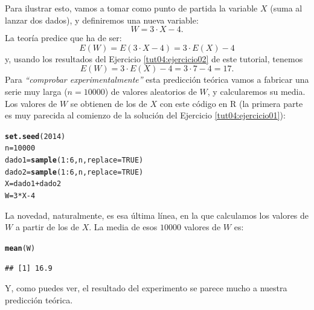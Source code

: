 \documentclass[10pt,a4paper]{article}\usepackage[]{graphicx}\usepackage[]{color}
\makeatletter
\newcommand{\hlnum}[1]{\textcolor[rgb]{0.686,0.059,0.569}{#1}}%
\newcommand{\hlopt}[1]{\textcolor[rgb]{0,0,0}{#1}}%
\newcommand{\hlstd}[1]{\textcolor[rgb]{0.345,0.345,0.345}{#1}}%
\newcommand{\hlkwb}[1]{\textcolor[rgb]{0.69,0.353,0.396}{#1}}%
\newcommand{\hlkwc}[1]{\textcolor[rgb]{0.333,0.667,0.333}{#1}}%
\newcommand{\hlkwd}[1]{\textcolor[rgb]{0.737,0.353,0.396}{\textbf{#1}}}%
\newenvironment{kframe}{%
 \def\at@end@of@kframe{}%
 \ifinner\ifhmode%
  \def\at@end@of@kframe{\end{minipage}}%
  \begin{minipage}{\columnwidth}%
 \fi\fi%
 \def\FrameCommand##1{\hskip\@totalleftmargin \hskip-\fboxsep
 \colorbox{shadecolor}{##1}\hskip-\fboxsep
     \hskip-\linewidth \hskip-\@totalleftmargin \hskip\columnwidth}%
 \MakeFramed {\advance\hsize-\width
   \@totalleftmargin\z@ \linewidth\hsize
   \@setminipage}}%
 {\par\unskip\endMakeFramed%
 \at@end@of@kframe}
\newenvironment{knitrout}{}{} %
\makeatother
\begin{document}
Para ilustrar esto, vamos a tomar como punto de partida la variable $X$ (suma al lanzar dos dados), y definiremos una nueva variable:
\[ W = 3\cdot X - 4.\]
La teoría predice que ha de ser:
\[ E(W) = E(3\cdot X - 4)= 3\cdot E(X) -4\]
y, usando los resultados del Ejercicio \ref{tut04:ejercicio02} de este tutorial, tenemos
\[ E(W) = 3\cdot E(X) - 4 = 3\cdot 7 - 4 =17.\]
Para {\em ``comprobar experimentalmente''} esta predicción teórica vamos a fabricar una serie muy larga ($n = 10000$) de valores aleatorios de $W$, y calcularemos su media. Los valores de $W$ se obtienen de los de $X$ con este código en R (la primera parte es muy parecida al comienzo de la solución del Ejercicio \ref{tut04:ejercicio01}):
\begin{knitrout}
\color{fgcolor}\begin{kframe}
\begin{alltt}
\hlkwd{set.seed}\hlstd{(}\hlnum{2014}\hlstd{)}
\hlstd{n} \hlkwb{=} \hlnum{10000}
\hlstd{dado1} \hlkwb{=} \hlkwd{sample}\hlstd{(}\hlnum{1}\hlopt{:}\hlnum{6}\hlstd{, n,} \hlkwc{replace}\hlstd{=}\hlnum{TRUE}\hlstd{)}
\hlstd{dado2} \hlkwb{=} \hlkwd{sample}\hlstd{(}\hlnum{1}\hlopt{:}\hlnum{6}\hlstd{, n,} \hlkwc{replace}\hlstd{=}\hlnum{TRUE}\hlstd{)}
\hlstd{X} \hlkwb{=} \hlstd{dado1} \hlopt{+} \hlstd{dado2}
\hlstd{W} \hlkwb{=} \hlnum{3} \hlopt{*} \hlstd{X} \hlopt{-} \hlnum{4}
\end{alltt}
\end{kframe}
\end{knitrout}
La novedad, naturalmente, es esa última línea, en la que calculamos los valores de $W$ a partir de los de $X$. La media de esos $10000$ valores de $W$ es:
\begin{knitrout}
\color{fgcolor}\begin{kframe}
\begin{alltt}
\hlkwd{mean}\hlstd{(W)}
\end{alltt}
\begin{verbatim}
## [1] 16.9
\end{verbatim}
\end{kframe}
\end{knitrout}
Y, como puedes ver, el resultado del experimento se parece mucho a nuestra predicción teórica.
\end{document}
